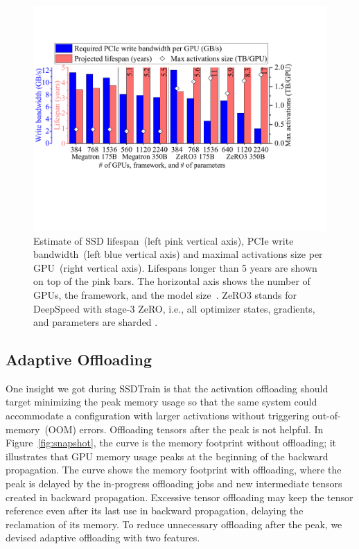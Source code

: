 \begin{figure}[!t]
\centering
\includegraphics[width=0.95\linewidth]{figures/SSDTrain/ProjectedPerfModel3.pdf.pdf}
\caption{\label{fig:projected_perf_model} Estimate of SSD lifespan~(left pink vertical axis), PCIe write bandwidth~(left blue vertical axis) and maximal activations size per GPU~(right vertical axis). Lifespans longer than 5 years are shown on top of the pink bars. The horizontal axis shows the number of GPUs, the framework, and the model size~\cite{shoeybiMegatronLMTrainingMultiBillion2020a}. ZeRO3 stands for DeepSpeed with stage-3 ZeRO, i.e., all optimizer states, gradients, and parameters are sharded .}
\end{figure}



\subsection{Adaptive Offloading}
\label{sec:adaptive}

One insight we got during SSDTrain is that the activation offloading should target minimizing the peak memory usage so that the same system could accommodate a configuration with larger activations without triggering out-of-memory~(OOM) errors. Offloading tensors after the peak is not helpful. In Figure~\ref{fig:snapshot}, the  curve is the memory footprint without offloading; it illustrates that GPU memory usage peaks at the beginning of the backward propagation. The  curve shows the memory footprint with offloading, where the peak is delayed by the in-progress offloading jobs and new intermediate tensors created in backward propagation. Excessive tensor offloading may keep the tensor reference even after its last use in backward propagation, delaying the reclamation of its memory. To reduce unnecessary offloading after the peak, we devised adaptive offloading with two features.

